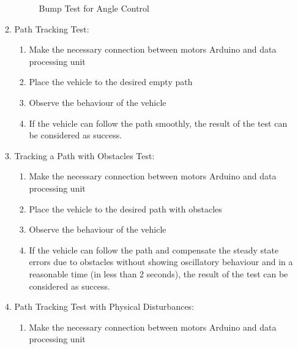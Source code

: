 \documentclass[a4paper,12pt]{article}
\begin{document}
\begin{enumerate}
\begin{enumerate}
\begin{figure}[h]
\caption{Bump Test for Angle Control \label{fig:bump-ang} }

\end{figure}		


\item Path Tracking Test: \label{test:d}	

\begin{enumerate}

\item Make the necessary connection between motors Arduino and data processing unit  

\item Place the vehicle to the desired empty path   

\item Observe the behaviour of the vehicle  

\item If the vehicle can follow the path smoothly, the result of the test can be considered as success.  

\end{enumerate}



\item Tracking a Path with Obstacles Test:	\label{test:e}	

\begin{enumerate}

\item Make the necessary connection between motors Arduino and data processing unit  

\item Place the vehicle to the desired path with obstacles  

\item Observe the behaviour of the vehicle  

\item If the vehicle can follow the path and compensate the steady state errors due to obstacles without showing oscillatory behaviour and in a reasonable time (in less than 2 seconds), the result of the test can be considered as success.  

\end{enumerate}



\item Path Tracking Test with Physical Disturbances: \label{test:f}	

\begin{enumerate}

\item Make the necessary connection between motors Arduino and data processing unit  


\end{enumerate}
\end{enumerate}
\end{enumerate}
\end{document}
